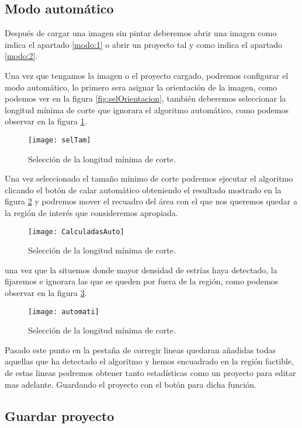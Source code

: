 \subsection{Modo automático}
Después de cargar una imagen sin pintar deberemos abrir una imagen como indica el apartado \ref{modo:1} o abrir un proyecto tal y como indica el apartado \ref{modo:2}.

Una vez que tengamos la imagen o el proyecto cargado, podremos configurar el modo automático, lo primero sera asignar la orientación de la imagen, como podemos ver en la figura \ref{fig:selOrientacion}, también deberemos seleccionar la longitud mínima de corte que ignorara el algoritmo automático, como podemos observar en la figura \ref{fig:selTam}.

\begin{figure}[h]
\centering
\texttt{[image: selTam]}
\caption{Selección de la longitud mínima de corte.}
\label{fig:selTam}
\end{figure}

Una vez seleccionado el tamaño mínimo de corte podremos ejecutar el algoritmo clicando el botón de calar automático obteniendo el resultado mostrado en la figura \ref{fig:CalculadasAuto} y podremos mover el recuadro del área con el que nos queremos quedar a la región de interés que consideremos apropiada.

\begin{figure}[h]
\centering
\texttt{[image: CalculadasAuto]}
\caption{Selección de la longitud mínima de corte.}
\label{fig:CalculadasAuto}
\end{figure}

una vez que la situemos donde mayor densidad de estrías haya detectado, la fijaremos e ignorara las que se queden por fuera de la región, como podemos observar en la figura \ref{fig:automati}.

\begin{figure}[h]
\centering
\texttt{[image: automati]}
\caption{Selección de la longitud mínima de corte.}
\label{fig:automati}
\end{figure}

Pasado este punto en la pestaña de corregir lineas quedaran añadidas todas aquellas que ha detectado el algoritmo y hemos encuadrado en la región factible, de estas lineas podremos obtener tanto estadísticas como un proyecto para editar mas adelante. Guardando el proyecto con el botón para dicha función.

\subsection{Guardar proyecto}

